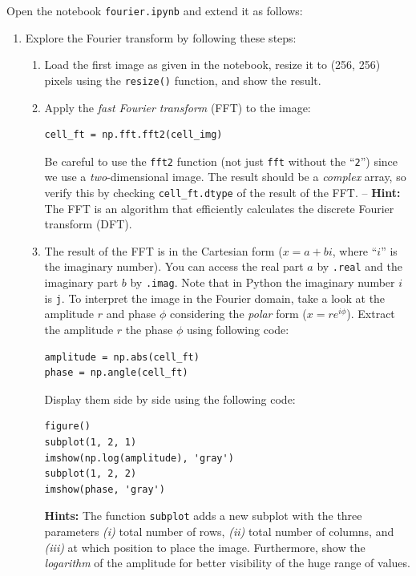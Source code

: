 \documentclass[12pt,a4paper]{article}
\begin{document}

\noindent
Open the notebook \texttt{fourier.ipynb} and extend it as follows:

\begin{enumerate}
\item Explore the Fourier transform by following these steps:
\begin{enumerate}
    \item Load the first image as given in the notebook, resize it to (256, 256) pixels using the \texttt{resize()} function, and show the result.
    \item Apply the \emph{fast Fourier transform} (FFT) to the image:
    \begin{Verbatim}[frame=single]
cell_ft = np.fft.fft2(cell_img)
    \end{Verbatim}
    Be careful to use the \texttt{fft2} function (not just \texttt{fft} without the ``\texttt{2}'') since we use a \emph{two}-dimensional image. The result should be a \emph{complex} array, so verify this by checking \texttt{cell\_ft.dtype} of the result of the FFT. -- \textbf{Hint:} The FFT is an algorithm that efficiently calculates the discrete Fourier transform (DFT).
    \item The result of the FFT is in the Cartesian form ($x = a + bi$, where ``$i$'' is the imaginary number). You can access the real part $a$ by \texttt{.real} and the imaginary part $b$ by \texttt{.imag}. Note that in Python the imaginary number $i$ is \texttt{j}. To interpret the image in the Fourier domain, take a look at the amplitude $r$ and phase $\phi$ considering the \emph{polar} form ($x = re^{i\phi}$). Extract the amplitude $r$ the phase $\phi$ using following code:
    \begin{Verbatim}[frame=single]
amplitude = np.abs(cell_ft)
phase = np.angle(cell_ft)
    \end{Verbatim}
    Display them side by side using the following code:
    \begin{Verbatim}[frame=single]
figure()
subplot(1, 2, 1)
imshow(np.log(amplitude), 'gray')
subplot(1, 2, 2)
imshow(phase, 'gray')
    \end{Verbatim}
    \textbf{Hints:} The function \texttt{subplot} adds a new subplot with the three parameters \textit{(i)} total number of rows, \textit{(ii)} total number of columns, and \textit{(iii)} at which position to place the image. Furthermore, show the \emph{logarithm} of the amplitude for better visibility of the huge range of values.

\end{enumerate}
\end{enumerate}
\end{document}

